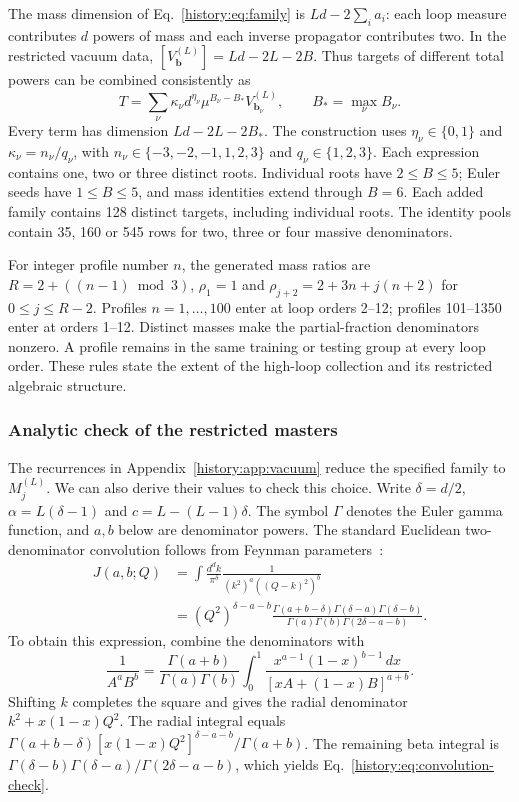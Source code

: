 The mass dimension of Eq.~\eqref{history:eq:family} is $Ld-2\sum_i a_i$: each loop measure contributes $d$ powers of mass and each inverse propagator contributes two. In the restricted vacuum data, $[V_{\boldsymbol b}^{(L)}]=Ld-2L-2B$. Thus targets of different total powers can be combined consistently as
\begin{equation}
 T=\sum_\nu \kappa_\nu d^{\eta_\nu}\mu^{B_\nu-B_*}
 V_{\boldsymbol b_\nu}^{(L)},\qquad B_*=\max_\nu B_\nu.
 \label{history:eq:weighted-target}
\end{equation}
Every term has dimension $Ld-2L-2B_*$. The construction uses $\eta_\nu\in\{0,1\}$ and $\kappa_\nu=n_\nu/q_\nu$, with $n_\nu\in\{-3,-2,-1,1,2,3\}$ and $q_\nu\in\{1,2,3\}$. Each expression contains one, two or three distinct roots. Individual roots have $2\leq B\leq5$; Euler seeds have $1\leq B\leq5$, and mass identities extend through $B=6$. Each added family contains 128 distinct targets, including individual roots. The identity pools contain 35, 160 or 545 rows for two, three or four massive denominators.

For integer profile number $n$, the generated mass ratios are $R=2+((n-1)\bmod3)$, $\rho_1=1$ and $\rho_{j+2}=2+3n+j(n+2)$ for $0\leq j\leq R-2$. Profiles $n=1,\ldots,100$ enter at loop orders 2--12; profiles 101--1350 enter at orders 1--12. Distinct masses make the partial-fraction denominators nonzero. A profile remains in the same training or testing group at every loop order. These rules state the extent of the high-loop collection and its restricted algebraic structure.

\subsubsection{Analytic check of the restricted masters}
The recurrences in Appendix~\ref{history:app:vacuum} reduce the specified family to $M_j^{(L)}$. We can also derive their values to check this choice. Write $\delta=d/2$, $\alpha=L(\delta-1)$ and $c=L-(L-1)\delta$. The symbol $\Gamma$ denotes the Euler gamma function, and $a,b$ below are denominator powers. The standard Euclidean two-denominator convolution follows from Feynman parameters~\cite{Weinzierl2022}:
\begin{align}
 J(a,b;Q)&=\int\frac{d^dk}{\pi^\delta}
 \frac1{(k^2)^a((Q-k)^2)^b}\nonumber\\
 &=(Q^2)^{\delta-a-b}
 \frac{\Gamma(a+b-\delta)\Gamma(\delta-a)\Gamma(\delta-b)}
 {\Gamma(a)\Gamma(b)\Gamma(2\delta-a-b)}.
 \label{history:eq:convolution-check}
\end{align}
To obtain this expression, combine the denominators with
\begin{equation}
 \frac1{A^aB^b}=\frac{\Gamma(a+b)}{\Gamma(a)\Gamma(b)}
 \int_0^1\frac{x^{a-1}(1-x)^{b-1}\,dx}{[xA+(1-x)B]^{a+b}}.
\end{equation}
Shifting $k$ completes the square and gives the radial denominator $k^2+x(1-x)Q^2$. The radial integral equals
$\Gamma(a+b-\delta)[x(1-x)Q^2]^{\delta-a-b}/\Gamma(a+b)$.
The remaining beta integral is $\Gamma(\delta-b)\Gamma(\delta-a)/\Gamma(2\delta-a-b)$, which yields Eq.~\eqref{history:eq:convolution-check}.

